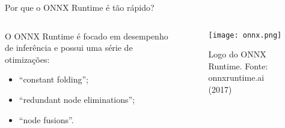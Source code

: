 \begin{frame}{Por que o ONNX Runtime é tão rápido?}
  \begin{columns}
    \begin{column}{0.5\textwidth}
      O ONNX Runtime é focado em desempenho de inferência e possui uma série de otimizações:
      \begin{itemize}
        \item ``constant folding'';
        \item ``redundant node eliminations'';
        \item ``node fusions''.
      \end{itemize}
    \end{column}
    \begin{column}{0.5\textwidth}
      \begin{figure}
        \centering
        \texttt{[image: onnx.png]}
        \caption{Logo do ONNX Runtime. Fonte: onnxruntime.ai (2017)}
      \end{figure}
    \end{column}
  \end{columns}
\end{frame}